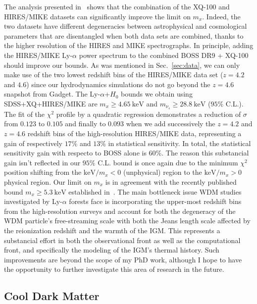 The analysis presented in~\cite{IrsicWDM} shows that the combination of the XQ-100 and HIRES/MIKE datasets can significantly improve the limit on $m_x$.  Indeed, the two datasets have different degeneracies between astrophysical and cosmological parameters that are disentangled when both data sets are combined, thanks to the higher resolution of the HIRES and MIKE spectrographs. In principle, adding the HIRES/MIKE Ly-$\alpha$ power spectrum to the combined BOSS DR9 + XQ-100 should improve our bounds. As was mentioned in Sec.~\ref{sec:data}, we can only make use of the two lowest redshift bins of the HIRES/MIKE data set ($z=4.2$ and $4.6$) since our hydrodynamics simulations do not go beyond the $z=4.6$ snapshot from \textsf{Gadget}. The Ly-$\alpha$+$H_0$ bounds we obtain using SDSS+XQ+HIRES/MIKE are $m_x \geqslant 4.65 ~\mathrm{keV}$ and $m_{\nu_s} \geqslant 28.8 ~\mathrm{keV}$ ($95\%$ C.L.).  The fit of the $\chi^2$ profile by a quadratic regression demonstrates a reduction of $\sigma$ from $0.123$ to $0.105$ and finally to $0.093$ when we add successively the $z=4.2$ and $z=4.6$ redshift bins of the high-resolution HIRES/MIKE data, representing a gain of respectively $17\%$ and $13\%$ in statistical sensitivity. In total, the statistical sensitivity gain with respecto to BOSS alone is $60\%$. The reason this substancial gain isn't reflected in our $95\%$ C.L. bound is once again due to the minimum $\chi^2$ position shifting from the $\mathrm{keV}/m_x < 0$ (unphysical) region to the $\mathrm{keV}/m_x > 0$ physical region. Our limit on $m_x$ is in agreement with the recently published bound $m_x \geqslant 5.3 ~\mathrm{keV}$  established in~\cite{IrsicWDM}. The main bottleneck issue WDM studies investigated by Ly-$\alpha$ forests face is incorporating the upper-most redshift bins from the high-resolution surveys and account for both the degeneracy of the WDM particle's free-streaming scale with both the Jeans length scale affected by the reionization redshift and the warmth of the IGM. This represents a substancial effort in both the observational front as well as the computational front, and specifically the modeling of the IGM's thermal history. Such improvements are beyond the scope of my PhD work, although I hope to have the opportunity to further investigate this area of research in the future. \\ 




\subsection{Cool Dark Matter}
\label{sec:res_rpsn}

